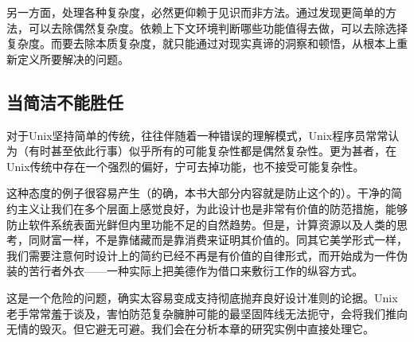 \documentclass[12pt,oneside]{book}
\begin{document}
另一方面，处理各种复杂度，必然更仰赖于见识而非方法。通过发现更简单的方法，可以去除偶然复杂度。依赖上下文环境判断哪些功能值得去做，可以去除选择复杂度。而要去除本质复杂度，就只能通过对现实真谛的洞察和顿悟，从根本上重新定义所要解决的问题。

\subsection{当简洁不能胜任}
对于Unix坚持简单的传统，往往伴随着一种错误的理解模式，Unix程序员常常认为（有时甚至依此行事）似乎所有的可能复杂性都是偶然复杂性。更为甚者，在Unix传统中存在一个强烈的偏好，宁可去掉功能，也不接受可能复杂性。

这种态度的例子很容易产生（的确，本书大部分内容就是防止这个的）。干净的简约主义让我们在多个层面上感觉良好，为此设计也是非常有价值的防范措施，能够防止软件系统表面光鲜但内里功能不足的自然趋势。但是，计算资源以及人类的思考，同财富一样，不是靠储藏而是靠消费来证明其价值的。同其它美学形式一样，我们需要注意何时设计上的简约已经不再是有价值的自律形式，而开始成为一件伪装的苦行者外衣——一种实际上把美德作为借口来敷衍工作的纵容方式。

这是一个危险的问题，确实太容易变成支持彻底抛弃良好设计准则的论据。Unix老手常常羞于谈及，害怕防范复杂臃肿可能的最坚固阵线无法扼守，会将我们推向无情的毁灭。但它避无可避。我们会在分析本章的研究实例中直接处理它。
\end{document}
